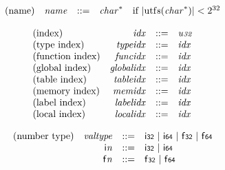 $$
\begin{array}{@{}lrrl@{}l@{}}
\mbox{(name)} & {\mathit{name}} &::=& {{\mathit{char}}^\ast} &\quad
  \mbox{if}~{|{\mathrm{utf{\scriptstyle8}}}({{\mathit{char}}^\ast})|} < {2^{32}} \\
\end{array}
$$

\vspace{1ex}

$$
\begin{array}{@{}lrrl@{}l@{}}
\mbox{(index)} & {\mathit{idx}} &::=& {\mathit{u{\scriptstyle32}}} \\
\mbox{(type index)} & {\mathit{typeidx}} &::=& {\mathit{idx}} \\
\mbox{(function index)} & {\mathit{funcidx}} &::=& {\mathit{idx}} \\
\mbox{(global index)} & {\mathit{globalidx}} &::=& {\mathit{idx}} \\
\mbox{(table index)} & {\mathit{tableidx}} &::=& {\mathit{idx}} \\
\mbox{(memory index)} & {\mathit{memidx}} &::=& {\mathit{idx}} \\
\mbox{(label index)} & {\mathit{labelidx}} &::=& {\mathit{idx}} \\
\mbox{(local index)} & {\mathit{localidx}} &::=& {\mathit{idx}} \\
\end{array}
$$

\vspace{1ex}

$$
\begin{array}{@{}lrrl@{}l@{}}
\mbox{(number type)} & {\mathit{valtype}} &::=& \mathsf{i{\scriptstyle32}} ~|~ \mathsf{i{\scriptstyle64}} ~|~ \mathsf{f{\scriptstyle32}} ~|~ \mathsf{f{\scriptstyle64}} \\
& {\mathsf{i}}{{\mathit{n}}} &::=& \mathsf{i{\scriptstyle32}} ~|~ \mathsf{i{\scriptstyle64}} \\
& {\mathsf{f}}{{\mathit{n}}} &::=& \mathsf{f{\scriptstyle32}} ~|~ \mathsf{f{\scriptstyle64}} \\
\end{array}
$$

